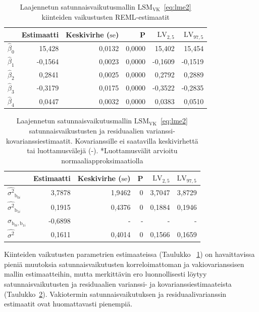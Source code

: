 \documentclass[finnish]{docopts}
\begin{document}
\begin{table}[H]
\centering
\begin{tabular}{lrrrrr}
\toprule
  & Estimaatti & Keskivirhe ($\text{se}$) & P & $\text{LV}_{2,5}$ & $\text{LV}_{97,5}$\\
\midrule
$\hat{\beta}_0$ & 15,428 & 0,0132 & 0,0000 & 15,402 & 15,454\\
$\hat{\beta}_1$ & -0,1564 & 0,0023 & 0,0000 & -0,1609 & -0,1519\\
$\hat{\beta}_2$ & 0,2841 & 0,0025 & 0,0000 & 0,2792 & 0,2889\\
$\hat{\beta}_3$ & -0,3179 & 0,0175 & 0,0000 & -0,3522 & -0,2835\\
$\hat{\beta}_4$ & 0,0447 & 0,0032 & 0,0000 & 0,0383 & 0,0510\\
\bottomrule
\end{tabular}
\caption{Laajennetun satunnaisvaikutusmallin $\text{LSM}_{\text{VK}}$~\ref{eq:lme2} kiinteiden vaikustusten REML-estimaatit}
\label{table:lme2vk}
\end{table}

\begin{table}[H]
\centering
\begin{tabular}{lrrrrr}
\toprule
  & Estimaatti & Keskivirhe ($\text{se}$) & P & $\text{LV}_{2,5}$ & $\text{LV}_{97,5}$\\
\midrule
$\hat{\sigma^2}_{\text{b}_{0i}}$ & 3,7878 & 1,9462 & 0 & 3,7047 & 3,8729 \\
$\hat{\sigma^2}_{\text{b}_{1i}}$ & 0,1915 & 0,4376 & 0 & 0,1884 & 0,1946 \\
$\hat{\sigma}_{\text{b}_{0i}, \text{b}_{1i}}$ & -0,6898 & - & - & - & - \\
\addlinespace
$\hat{\sigma^2}$ & 0,1611 & 0,4014 & 0 & 0,1566 & 0,1659 \\
\bottomrule
\end{tabular}
\caption{Laajennetun satunnaisvaikutusmallin $\text{LSM}_{\text{VK}}$~\ref{eq:lme2} satunnaisvaikustusten ja residuaalien varianssi-kovarianssiestimaatit. Kovarianssille ei saatavilla keskivirhettä tai luottamusvälejä (-). *Luottamusvälit arvioitu normaaliapproksimaatiolla}
\label{table:lme3vk}
\end{table}

Kiinteiden vaikutusten parametrien estimaateissa (Taulukko ~\ref{table:lme2vk}) on havaittavissa pieniä muutoksia satunnaisvaikutusten korreloimattoman ja vakiovarianssisen mallin estimaatteihin, mutta merkittävin ero luonnollisesti löytyy satunnaisvaikutusten ja residuaalien varianssi- ja kovarianssiestimaateista (Taulukko~\ref{table:lme3vk}). Vakiotermin satunnaisvaikutuksen ja residuaalivarianssin estimaatit ovat huomattavasti pienempiä.\\
\end{document}

